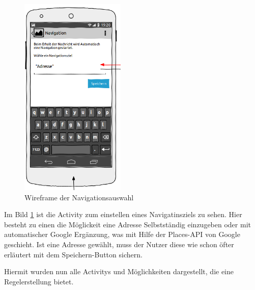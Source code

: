 \FloatBarrier
\begin{figure}
\vspace{-13pt}
\includegraphics[width=5cm]{Bilder/WireframeNaviAuswahl.png}
\caption{Wireframe der Navigationsauswahl}
\label{Wireframe NaviAuswahl}
\vspace{-230pt}
\end{figure}
Im Bild \ref{Wireframe NaviAuswahl} ist die Activity zum einstellen eines Navigatinsziels zu sehen. Hier besteht zu einen die M\"oglickeit eine Adresse Selbstst\"andig einzugeben oder mit automatischer Google Erg\"anzung, was mit Hilfe der Places-\ac{API} von Google geschieht. Ist eine Adresse gew\"ahlt, muss der Nutzer diese wie schon \"ofter erl\"autert mit dem Speichern-Button sichern.

Hiermit wurden nun alle Activitys und M\"oglichkeiten dargestellt, die eine Regelerstellung bietet.
\newpage

